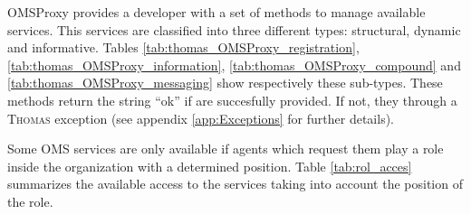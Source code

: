 OMSProxy provides a developer with a set of methods to manage available services. This services are classified into three different types: structural, dynamic and informative. Tables \ref{tab:thomas_OMSProxy_registration}, \ref{tab:thomas_OMSProxy_information}, \ref{tab:thomas_OMSProxy_compound} and \ref{tab:thomas_OMSProxy_messaging} show respectively these sub-types. These methods return the string ``ok'' if are succesfully provided. If not, they through a \textsc{Thomas} exception (see appendix \ref{app:Exceptions} for further details). 

Some OMS services are only available if  agents which request them play a role inside the organization with a determined position. Table \ref{tab:rol_acces} summarizes  the available access to the services taking into account the position of the role.







